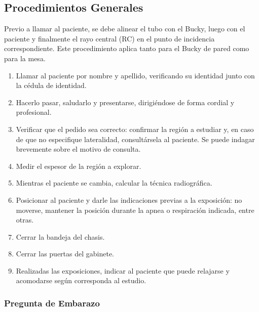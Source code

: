	\subsection{Procedimientos Generales}
	
	Previo a llamar al paciente, se debe alinear el tubo con el Bucky, luego con el
	paciente y finalmente el rayo central (RC) en el punto de incidencia
	correspondiente. Este procedimiento aplica tanto para el Bucky de pared como para
	la mesa.
	
	\begin{enumerate}
		\item Llamar al paciente por nombre y apellido, verificando su identidad
		junto con la cédula de identidad.
		
		\item Hacerlo pasar, saludarlo y presentarse, dirigiéndose de forma cordial
		y profesional.
		
		\item Verificar que el pedido sea correcto: confirmar la región a estudiar y,
		en caso de que no especifique lateralidad, consultársela al paciente. Se puede
		indagar brevemente sobre el motivo de consulta.
		
		\item Medir el espesor de la región a explorar.
		
		\item Mientras el paciente se cambia, calcular la técnica radiográfica.
		
		\item Posicionar al paciente y darle las indicaciones previas a la exposición:
		no moverse, mantener la posición durante la apnea o respiración indicada, entre
		otras.
		
		\item Cerrar la bandeja del chasis.
		
		\item Cerrar las puertas del gabinete.
		
		\item Realizadas las exposiciones, indicar al paciente que puede relajarse y
		acomodarse según corresponda al estudio.
	\end{enumerate}
	
	\subsubsection*{Pregunta de Embarazo}
	
